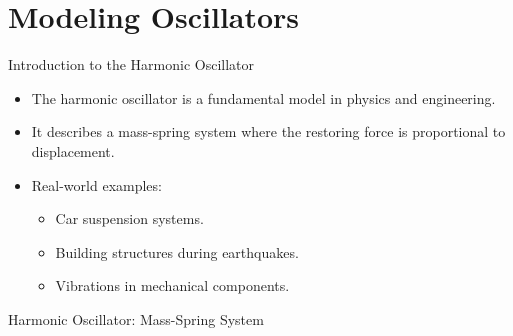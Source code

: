 \documentclass{beamer}
\begin{document}
\section{Modeling Oscillators}

\begin{frame}{Introduction to the Harmonic Oscillator}
    \begin{itemize}
        \item The harmonic oscillator is a fundamental model in physics and engineering.
        \item It describes a mass-spring system where the restoring force is proportional to displacement.
        \item Real-world examples:
        \begin{itemize}
            \item Car suspension systems.
            \item Building structures during earthquakes.
            \item Vibrations in mechanical components.
        \end{itemize}
    \end{itemize}
\end{frame}

\begin{frame}{Harmonic Oscillator: Mass-Spring System}
    \begin{center}
    \end{center}
\end{frame}
\end{document}
